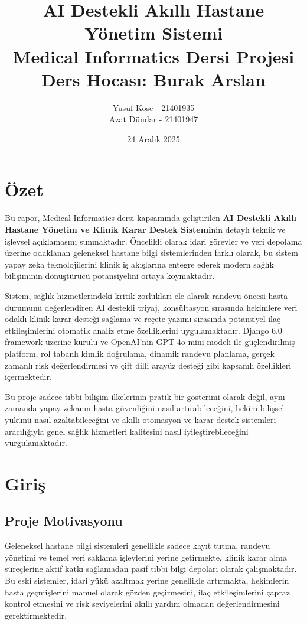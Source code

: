\documentclass[12pt,a4paper]{article}
\title{
    \textbf{AI Destekli Akıllı Hastane Yönetim Sistemi} \\
    \large Medical Informatics Dersi Projesi \\
    \vspace{0.5cm}
    \normalsize Ders Hocası: Burak Arslan
}
\author{Yusuf Köse - 21401935 \\ Azat Dündar - 21401947}
\date{24 Aralık 2025}
\begin{document}
\maketitle
\newpage

\tableofcontents
\newpage

\section{Özet}
Bu rapor, Medical Informatics dersi kapsamında geliştirilen \textbf{AI Destekli Akıllı Hastane Yönetim ve Klinik Karar Destek Sistemi}nin detaylı teknik ve işlevsel açıklamasını sunmaktadır. Öncelikli olarak idari görevler ve veri depolama üzerine odaklanan geleneksel hastane bilgi sistemlerinden farklı olarak, bu sistem yapay zeka teknolojilerini klinik iş akışlarına entegre ederek modern sağlık bilişiminin dönüştürücü potansiyelini ortaya koymaktadır.

Sistem, sağlık hizmetlerindeki kritik zorlukları ele alarak randevu öncesi hasta durumunu değerlendiren AI destekli triyaj, konsültasyon sırasında hekimlere veri odaklı klinik karar desteği sağlama ve reçete yazımı sırasında potansiyel ilaç etkileşimlerini otomatik analiz etme özelliklerini uygulamaktadır. Django 6.0 framework üzerine kurulu ve OpenAI'nin GPT-4o-mini modeli ile güçlendirilmiş platform, rol tabanlı kimlik doğrulama, dinamik randevu planlama, gerçek zamanlı risk değerlendirmesi ve çift dilli arayüz desteği gibi kapsamlı özellikleri içermektedir.

Bu proje sadece tıbbi bilişim ilkelerinin pratik bir gösterimi olarak değil, aynı zamanda yapay zekanın hasta güvenliğini nasıl artırabileceğini, hekim bilişsel yükünü nasıl azaltabileceğini ve akıllı otomasyon ve karar destek sistemleri aracılığıyla genel sağlık hizmetleri kalitesini nasıl iyileştirebileceğini vurgulamaktadır.

\section{Giriş}

\subsection{Proje Motivasyonu}
Geleneksel hastane bilgi sistemleri genellikle sadece kayıt tutma, randevu yönetimi ve temel veri saklama işlevlerini yerine getirmekte, klinik karar alma süreçlerine aktif katkı sağlamadan pasif tıbbi bilgi depoları olarak çalışmaktadır. Bu eski sistemler, idari yükü azaltmak yerine genellikle artırmakta, hekimlerin hasta geçmişlerini manuel olarak gözden geçirmesini, ilaç etkileşimlerini çapraz kontrol etmesini ve risk seviyelerini akıllı yardım olmadan değerlendirmesini gerektirmektedir.
\end{document}
